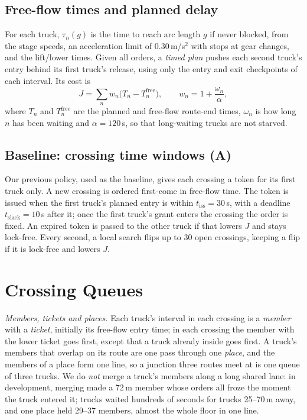 \documentclass[conference]{IEEEtran}
\begin{document}
\subsection{Free-flow times and planned delay}
For each truck, $\tau_n(g)$ is the time to reach arc length $g$ if never
blocked, from the stage speeds, an acceleration limit of 0.30\,m/s$^2$ with
stops at gear changes, and the lift/lower times. Given all orders, a
\emph{timed plan} pushes each second truck's entry behind its first truck's
release, using only the entry and exit checkpoints of each interval. Its cost
is
\begin{equation}
J=\sum_n w_n\bigl(T_n-T_n^{\mathrm{free}}\bigr),\qquad
w_n = 1+\frac{\omega_n}{\alpha},
\label{eq:cost}
\end{equation}
where $T_n$ and $T_n^{\mathrm{free}}$ are the planned and free-flow route-end
times, $\omega_n$ is how long $n$ has been waiting and $\alpha=120$\,s, so that
long-waiting trucks are not starved.

\subsection{Baseline: crossing time windows (A)}
Our previous policy, used as the baseline, gives each crossing a token for its
first truck only. A new crossing is ordered first-come in free-flow time.
The token is issued when the first truck's planned entry is within
$t_{\mathrm{iss}}=30$\,s, with a deadline $t_{\mathrm{slack}}=10$\,s after
it; once the first truck's grant enters the crossing the order is fixed. An
expired token is passed to the other truck if that lowers $J$ and stays
lock-free. Every second, a local search flips up to 30 open crossings, keeping
a flip if it is lock-free and lowers $J$.

\section{Crossing Queues}
\label{sec:queues}

\emph{Members, tickets and places.} Each truck's interval in each crossing is
a \emph{member} with a \emph{ticket}, initially its free-flow entry time; in
each crossing the member with the lower ticket goes first, except that a truck
already inside goes first. A truck's members that overlap on its route are one
pass through one \emph{place}, and the members of a place form one line, so a
junction three routes meet at is one queue of three trucks. We do \emph{not}
merge a truck's members along a long shared lane: in development, merging made
a 72\,m member whose orders all froze the moment the truck entered it; trucks
waited hundreds of seconds for trucks 25--70\,m away, and one place held 29--37
members, almost the whole floor in one line.
\end{document}
